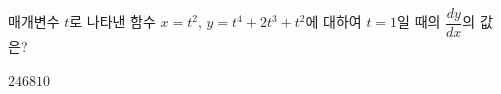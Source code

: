 매개변수 $t$로 나타낸 함수 $x=t^2$, $y=t^4+2t^3+t^2$에 대하여 $t=1$일 때의 $\dfrac{dy}{dx}$의 값은?
\begin{choices32}{$2$}{$4$}{$6$}{$8$}{$10$}\end{choices32}
